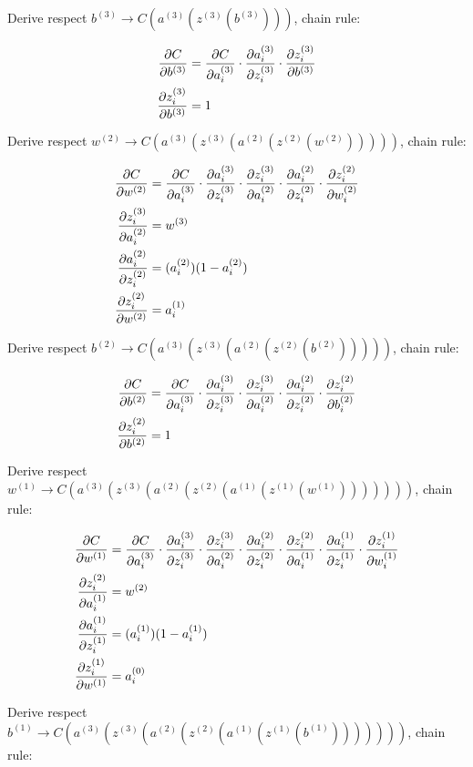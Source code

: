 \documentclass{article}
\begin{document}
Derive respect $b^{(3)} \rightarrow C(a^{(3)}(z^{(3)}(b^{(3)})))$,
chain rule:

\begin{align}
\frac{\partial C}{\partial b^{(3)}} &= \frac{\partial C}{\partial a_i^{(3)}}\cdot\frac{\partial a_i^{(3)}}{\partial z_i^{(3)}}\cdot\frac{\partial z_i^{(3)}}{\partial b^{(3)}} \\
\frac{\partial z_i^{(3)}}{\partial b^{(3)}} &= 1
\end{align}

Derive respect $w^{(2)} \rightarrow C(a^{(3)}(z^{(3)}(a^{(2)}(z^{(2)}(w^{(2)})))))$,
chain rule:

\begin{align}
  \frac{\partial C}{\partial w^{(2)}} &= \frac{\partial C}{\partial a_i^{(3)}}\cdot\frac{\partial a_i^{(3)}}{\partial z_i^{(3)}}\cdot\frac{\partial z_i^{(3)}}{\partial a_i^{(2)}}
  \cdot \frac{\partial a_i^{(2)}}{\partial z_i^{(2)}}\cdot\frac{\partial z_i^{(2)}}{\partial w_i^{(2)}}\\
\frac{\partial z_i^{(3)}}{\partial a_i^{(2)}} &= w^{(3)} \\
\frac{\partial a_i^{(2)}}{\partial z_i^{(2)}} &= ({a_i^{(2)}}) (1-{a_i^{(2)}}) \\
\frac{\partial z_i^{(2)}}{\partial w^{(2)}} &= a_i^{(1)}
\end{align}

Derive respect $b^{(2)} \rightarrow C(a^{(3)}(z^{(3)}(a^{(2)}(z^{(2)}(b^{(2)})))))$,
chain rule:

\begin{align}
  \frac{\partial C}{\partial b^{(2)}} &= \frac{\partial C}{\partial a_i^{(3)}}\cdot\frac{\partial a_i^{(3)}}{\partial z_i^{(3)}}\cdot\frac{\partial z_i^{(3)}}{\partial a_i^{(2)}}
  \cdot \frac{\partial a_i^{(2)}}{\partial z_i^{(2)}}\cdot\frac{\partial z_i^{(2)}}{\partial b_i^{(2)}}\\
\frac{\partial z_i^{(2)}}{\partial b^{(2)}} &= 1
\end{align}

\pagebreak

Derive respect $w^{(1)} \rightarrow C(a^{(3)}(z^{(3)}(a^{(2)}(z^{(2)}(a^{(1)}(z^{(1)}(w^{(1)})))))))$,
chain rule:

\begin{align}
  \frac{\partial C}{\partial w^{(1)}} &= \frac{\partial C}{\partial a_i^{(3)}}
  \cdot \frac{\partial a_i^{(3)}}{\partial z_i^{(3)}}
  \cdot \frac{\partial z_i^{(3)}}{\partial a_i^{(2)}}
  \cdot \frac{\partial a_i^{(2)}}{\partial z_i^{(2)}}
  \cdot \frac{\partial z_i^{(2)}}{\partial a_i^{(1)}}
  \cdot \frac{\partial a_i^{(1)}}{\partial z_i^{(1)}}
  \cdot \frac{\partial z_i^{(1)}}{\partial w_i^{(1)}} \\
\frac{\partial z_i^{(2)}}{\partial a_i^{(1)}} &= w^{(2)} \\
\frac{\partial a_i^{(1)}}{\partial z_i^{(1)}} &= ({a_i^{(1)}}) (1-{a_i^{(1)}}) \\
\frac{\partial z_i^{(1)}}{\partial w^{(1)}} &= a_i^{(0)}
\end{align}

Derive respect $b^{(1)} \rightarrow C(a^{(3)}(z^{(3)}(a^{(2)}(z^{(2)}(a^{(1)}(z^{(1)}(b^{(1)})))))))$,
chain rule:
\end{document}
